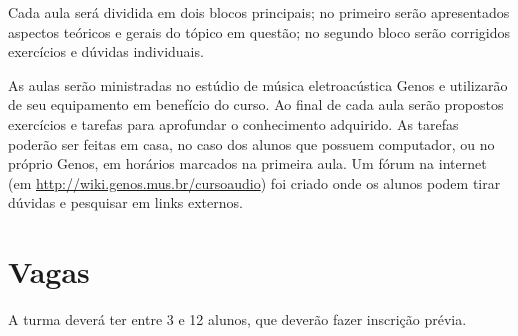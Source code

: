 \documentclass{article}
\begin{document}
Cada aula será dividida em dois blocos principais; no primeiro serão
apresentados aspectos teóricos e gerais do tópico em questão; no
segundo bloco serão corrigidos exercícios e dúvidas individuais.

As aulas serão ministradas no estúdio de música eletroacústica Genos e
utilizarão de seu equipamento em benefício do curso. Ao final de cada
aula serão propostos exercícios e tarefas para aprofundar o
conhecimento adquirido. As tarefas poderão ser feitas em casa, no caso
dos alunos que possuem computador, ou no próprio Genos, em horários
marcados na primeira aula.  Um fórum na internet (em
\url{http://wiki.genos.mus.br/cursoaudio}) foi criado onde os alunos
podem tirar dúvidas e pesquisar em links externos.

\section{Vagas}

A turma deverá ter entre 3 e 12 alunos, que deverão fazer inscrição prévia.

\nocite{roads96:_comput_music_tutor,gibson02:_artis_pro_series,iazzetad.:_tutor_de_e,boulanger00:_csoun_book,dodge97:_comput_music,menezes03:_music_em_palav_e_sons,menezes96,menezes06:_maxim,moore90:_elemen_of_comput_music,schaeffer93:_tratad_dos_objet_music}


% 

\end{document}
